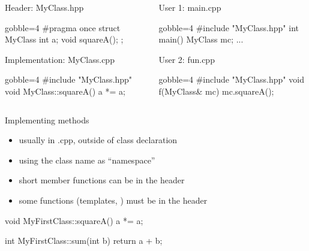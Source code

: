 \begin{frame}[fragile]
  \begin{columns}[t]
    \begin{column}{.45\textwidth}
    \begin{block}{Header: MyClass.hpp}
      \begin{cppcode*}{gobble=4}
        #pragma once
        struct MyClass {
          int a;
          void squareA();
        };
      \end{cppcode*}
    \end{block}
    \begin{block}{Implementation: MyClass.cpp}
      \begin{cppcode*}{gobble=4}
        #include "MyClass.hpp"
        void MyClass::squareA() {
          a *= a;
        }
      \end{cppcode*}
    \end{block}
    \end{column}
    \begin{column}{.45\textwidth}
    \begin{block}{User 1: main.cpp}
      \begin{cppcode*}{gobble=4}
        #include "MyClass.hpp"
        int main() {
          MyClass mc;
          ...
        }
      \end{cppcode*}
    \end{block}
    \begin{block}{User 2: fun.cpp}
      \begin{cppcode*}{gobble=4}
        #include "MyClass.hpp"
        void f(MyClass& mc) {
          mc.squareA();
        }
      \end{cppcode*}
    \end{block}
    \end{column}
  \end{columns}
\end{frame}

\begin{frame}[fragile]
  \begin{goodpractice}{Implementing methods}
    \begin{itemize}
    \item usually in .cpp, outside of class declaration
    \item using the class name as ``namespace''
    \item short member functions can be in the header
    \item some functions (templates, ) must be in the header
    \end{itemize}
  \end{goodpractice}
  \begin{cppcode}
    void MyFirstClass::squareA() {
      a *= a;
    }

    int MyFirstClass::sum(int b) {
      return a + b;
    }
  \end{cppcode}
\end{frame}

